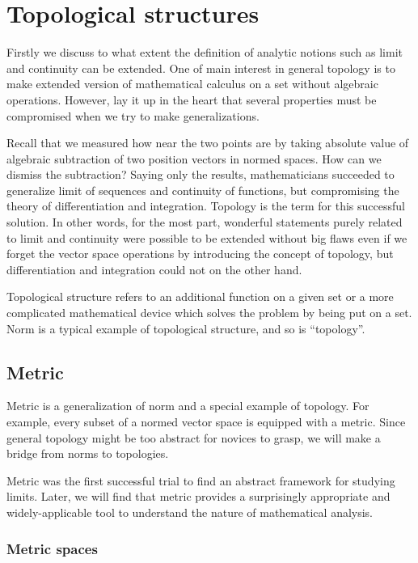 \documentclass{../crs}
\begin{document}
\mainmatter


\chapter{Topological structures}

Firstly we discuss to what extent the definition of analytic notions such as limit and continuity can be extended.
One of main interest in general topology is to make extended version of mathematical calculus on a set without algebraic operations.
However, lay it up in the heart that several properties must be compromised when we try to make generalizations.

Recall that we measured how near the two points are by taking absolute value of algebraic subtraction of two position vectors in normed spaces.
How can we dismiss the subtraction?
Saying only the results, mathematicians succeeded to generalize limit of sequences and continuity of functions, but compromising the theory of differentiation and integration.
Topology is the term for this successful solution.
In other words, for the most part, wonderful statements purely related to limit and continuity were possible to be extended without big flaws even if we forget the vector space operations by introducing the concept of topology, but differentiation and integration could not on the other hand.
 
Topological structure refers to an additional function on a given set or a more complicated mathematical device which solves the problem by being put on a set.
Norm is a typical example of topological structure, and so is ``topology''.


\section{Metric}

Metric is a generalization of norm and a special example of topology.
For example, every subset of a normed vector space is equipped with a metric.
Since general topology might be too abstract for novices to grasp, we will make a bridge from norms to topologies.

Metric was the first successful trial to find an abstract framework for studying limits.
Later, we will find that metric provides a surprisingly appropriate and widely-applicable tool to understand the nature of mathematical analysis.

\subsection{Metric spaces}
\end{document}

